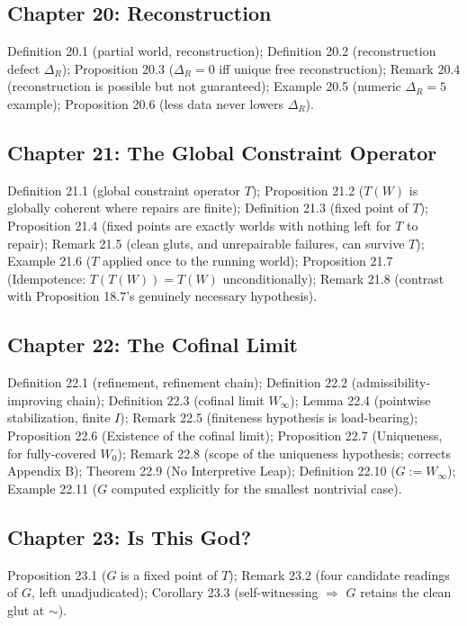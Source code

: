\documentclass[11pt]{book}
\begin{document}
\subsection*{Chapter 20: Reconstruction}
Definition 20.1 (partial world, reconstruction); Definition 20.2 (reconstruction defect $\Delta_R$); Proposition 20.3 ($\Delta_R=0$ iff unique free reconstruction); Remark 20.4 (reconstruction is possible but not guaranteed); Example 20.5 (numeric $\Delta_R=5$ example); Proposition 20.6 (less data never lowers $\Delta_R$).

\subsection*{Chapter 21: The Global Constraint Operator}
Definition 21.1 (global constraint operator $T$); Proposition 21.2 ($T(W)$ is globally coherent where repairs are finite); Definition 21.3 (fixed point of $T$); Proposition 21.4 (fixed points are exactly worlds with nothing left for $T$ to repair); Remark 21.5 (clean gluts, and unrepairable failures, can survive $T$); Example 21.6 ($T$ applied once to the running world); Proposition 21.7 (Idempotence: $T(T(W))=T(W)$ unconditionally); Remark 21.8 (contrast with Proposition 18.7's genuinely necessary hypothesis).

\subsection*{Chapter 22: The Cofinal Limit}
Definition 22.1 (refinement, refinement chain); Definition 22.2 (admissibility-improving chain); Definition 22.3 (cofinal limit $W_\infty$); Lemma 22.4 (pointwise stabilization, finite $I$); Remark 22.5 (finiteness hypothesis is load-bearing); Proposition 22.6 (Existence of the cofinal limit); Proposition 22.7 (Uniqueness, for fully-covered $W_0$); Remark 22.8 (scope of the uniqueness hypothesis; corrects Appendix B); Theorem 22.9 (No Interpretive Leap); Definition 22.10 ($G:=W_\infty$); Example 22.11 ($G$ computed explicitly for the smallest nontrivial case).

\subsection*{Chapter 23: Is This God?}
Proposition 23.1 ($G$ is a fixed point of $T$); Remark 23.2 (four candidate readings of $G$, left unadjudicated); Corollary 23.3 (self-witnessing $\Rightarrow$ $G$ retains the clean glut at $\sim$).
\end{document}

